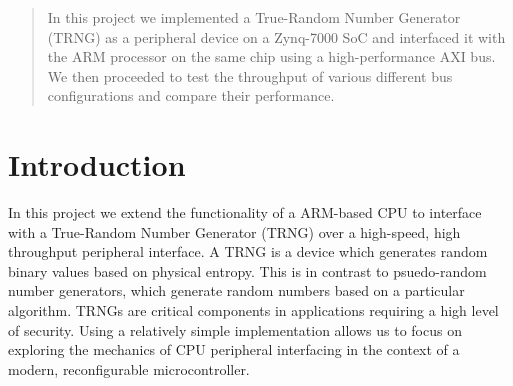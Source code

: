 \documentclass[journal]{IEEEtran}
\begin{document}




\maketitle


\begin{abstract}
In this project we implemented a True-Random Number Generator (TRNG) as a peripheral device on a Zynq-7000 SoC and interfaced it with the ARM processor on the same chip using a high-performance AXI bus. We then proceeded to test the throughput of various different bus configurations and compare their performance.
\end{abstract}


%
\IEEEpeerreviewmaketitle


\section{Introduction}

In this project we extend the functionality of a ARM-based CPU to interface with a True-Random Number Generator (TRNG) over a high-speed, high throughput peripheral interface.  A TRNG is a device which generates random binary values based on physical entropy. This is in contrast to psuedo-random number generators, which generate random numbers based on a particular algorithm. TRNGs are critical components in applications requiring a high level of security. Using a relatively simple implementation allows us to focus on exploring the mechanics of CPU peripheral interfacing in the context of a modern, reconfigurable microcontroller.  
\end{document}
